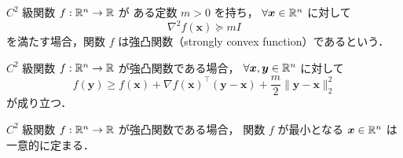 \begin{definition}
    $C^2$ 級関数 $f : \mathbb{R}^n \to \mathbb{R}$ が
    ある定数 $m > 0$ を持ち，
    $\forall \bm{x} \in \mathbb{R}^n$ に対して
    \begin{equation}
        \nabla^2 f(\bm{x}) \succeq m I
    \end{equation}
    を満たす場合，関数 $f$ は強凸関数（strongly convex function）であるという．
\end{definition}

\begin{theorem}
    $C^2$ 級関数 $f : \mathbb{R}^n \to \mathbb{R}$ が強凸関数である場合，
    $\forall \bm{x}, \bm{y} \in \mathbb{R}^n$ に対して
    \begin{equation}
        f(\bm{y}) \ge f(\bm{x}) + \nabla f(\bm{x})^\top (\bm{y} - \bm{x})
        + \frac{m}{2} \| \bm{y} - \bm{x} \|_2^2
    \end{equation}
    が成り立つ．
\end{theorem}

\begin{theorem}
    $C^2$ 級関数 $f : \mathbb{R}^n \to \mathbb{R}$ が強凸関数である場合，
    関数 $f$ が最小となる $\bm{x} \in \mathbb{R}^n$ は一意的に定まる．
\end{theorem}


